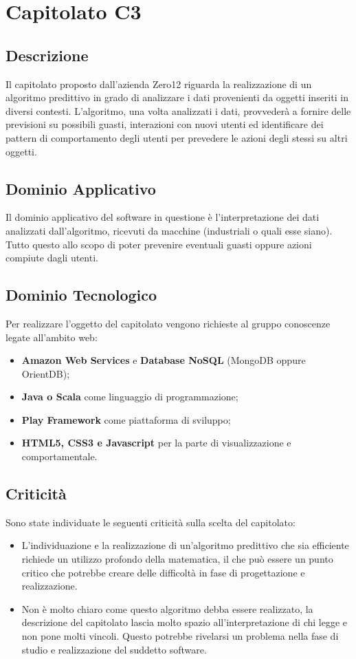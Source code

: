 \section{Capitolato C3}
\subsection{Descrizione}
Il capitolato proposto dall'azienda Zero12 riguarda la realizzazione di un algoritmo predittivo in grado di analizzare i dati provenienti da \textsf{oggetti} inseriti in diversi contesti. L'algoritmo, una volta analizzati i dati, provvederà a fornire delle previsioni su possibili guasti, interazioni con nuovi utenti ed identificare dei pattern di comportamento degli utenti per prevedere le azioni degli stessi su altri oggetti.

\subsection{Dominio Applicativo}
Il dominio applicativo del software in questione è l'interpretazione dei dati analizzati dall'algoritmo, ricevuti da macchine  (industriali o quali esse siano). Tutto questo allo scopo di poter prevenire eventuali guasti oppure azioni compiute dagli utenti.

\subsection{Dominio Tecnologico}
Per realizzare l’oggetto del capitolato vengono richieste al gruppo conoscenze legate all’ambito web:
\begin{itemize}
\item \textbf{Amazon Web Services} e \textbf{Database NoSQL} (MongoDB oppure OrientDB);
\item \textbf{Java o Scala} come linguaggio di programmazione;
\item \textbf{Play Framework} come piattaforma di sviluppo;
\item \textbf{HTML5, CSS3 e Javascript} per la parte di visualizzazione e comportamentale.
\end{itemize}

\subsection{Criticità}
Sono state individuate le seguenti criticità sulla scelta del capitolato:
\begin{itemize}
\item L'individuazione e la realizzazione di un'algoritmo predittivo che sia efficiente richiede un utilizzo profondo della matematica, il che può essere un punto critico che potrebbe creare delle difficoltà in fase di progettazione e realizzazione.
\item Non è molto chiaro come questo algoritmo debba essere realizzato, la descrizione del capitolato lascia molto spazio all'interpretazione di chi legge e non pone molti vincoli. Questo potrebbe rivelarsi un problema nella fase di studio e realizzazione del suddetto software.
\end{itemize}

